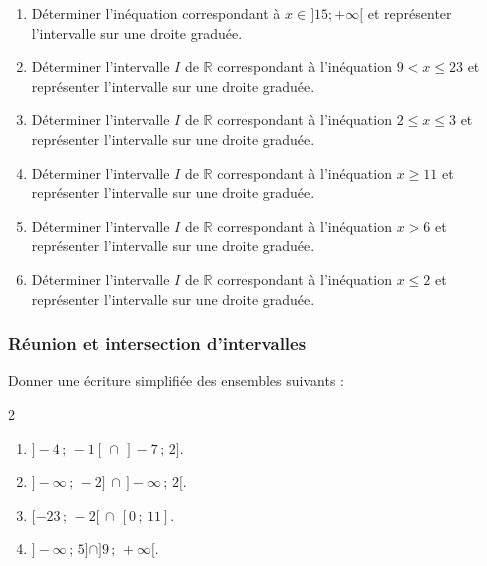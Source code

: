 {%
\begin{Exercice}
\leavevmode\vspace{-\baselineskip}
\begin{enumerate}[itemsep=1em]
	\item \begin{minipage}[t]{\linewidth}Déterminer l'inéquation correspondant à $x \in ]15;+\infty[$ et représenter l'intervalle sur une droite graduée.\end{minipage}
	\item \begin{minipage}[t]{\linewidth}Déterminer l'intervalle $I$ de $\mathbb{R}$ correspondant à l'inéquation $9< x\leqslant 23$ et représenter l'intervalle sur une droite graduée.\end{minipage}
	\item \begin{minipage}[t]{\linewidth}Déterminer l'intervalle $I$ de $\mathbb{R}$ correspondant à l'inéquation $2\leqslant x\leqslant 3$ et représenter l'intervalle sur une droite graduée.\end{minipage}
	\item \begin{minipage}[t]{\linewidth}Déterminer l'intervalle $I$ de $\mathbb{R}$ correspondant à l'inéquation $x\geqslant 11$ et représenter l'intervalle sur une droite graduée.\end{minipage}
	\item \begin{minipage}[t]{\linewidth}Déterminer l'intervalle $I$ de $\mathbb{R}$ correspondant à l'inéquation $x>6$ et représenter l'intervalle sur une droite graduée.\end{minipage}
	\item \begin{minipage}[t]{\linewidth}Déterminer l'intervalle $I$ de $\mathbb{R}$ correspondant à l'inéquation $x\leqslant 2$ et représenter l'intervalle sur une droite graduée.\end{minipage}
\end{enumerate}
\end{Exercice}


\newpage
\subsubsection*{Réunion et intersection d'intervalles}
\begin{Exercice}
Donner une écriture simplifiée des ensembles suivants :
\vspace{-0.5cm}
\begin{multicols}{2}
\begin{enumerate}[itemsep=1em]
	\item 
        $]-4\,;\,-1[\,\cap \,] -7\,;\,2]$.
	\item $]-\infty\,;\, -2]\,\cap \,]-\infty\,;\,2[$.
	\item 
          $[ -23\,;\,-2[\,\cap \,[0\,;\,11]$.
	\item $]-\infty \,; \,5]\cap ]9\,;\,+\infty[$.


\end{enumerate}
\end{multicols}
\end{Exercice}}
